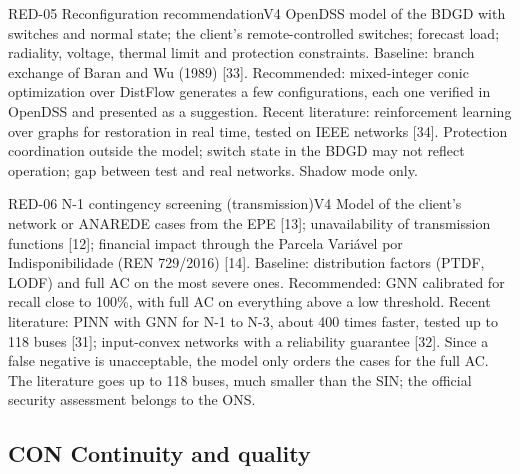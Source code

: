 \begin{ficha}{RED-05 \textperiodcentered{} Reconfiguration recommendation}{V4}
 OpenDSS model of the BDGD with switches and normal state; the
client's remote-controlled switches; forecast load; radiality, voltage,
thermal limit and protection constraints.
 Baseline: branch exchange of Baran and Wu (1989) [33].
Recommended: mixed-integer conic optimization over DistFlow generates a few
configurations, each one verified in OpenDSS and presented as a suggestion.
Recent literature: reinforcement learning over graphs for restoration in
real time, tested on IEEE networks [34].
 Protection coordination outside the model; switch state
in the BDGD may not reflect operation; gap between test and real networks.
Shadow mode only.
\end{ficha}

\begin{ficha}{RED-06 \textperiodcentered{} N-1 contingency screening (transmission)}{V4}
 Model of the client's network or ANAREDE cases from the EPE [13];
unavailability of transmission functions [12]; financial impact through the
Parcela Variável por Indisponibilidade (REN 729/2016) [14].
 Baseline: distribution factors (PTDF, LODF) and full
AC on the most severe ones. Recommended: GNN calibrated for recall close to
100\%, with full AC on everything above a low threshold. Recent literature: PINN
with GNN for N-1 to N-3, about 400 times faster, tested up to 118 buses
[31]; input-convex networks with a reliability guarantee [32].
 Since a false negative is unacceptable, the model only orders
the cases for the full AC. The
literature goes up to 118 buses, much smaller than the SIN; the official
security assessment belongs to the ONS.
\end{ficha}

\subsection{CON \textperiodcentered{} Continuity and quality}

